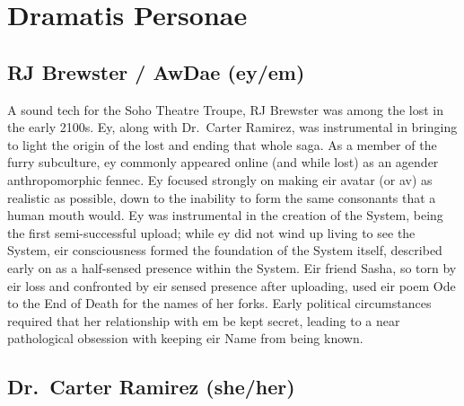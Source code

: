 \section*{Dramatis Personae}

\subsection{RJ Brewster / AwDae (ey/em)}

A sound tech for the Soho Theatre Troupe, RJ Brewster was among the lost in the early 2100s. Ey, along with Dr.~Carter Ramirez, was instrumental in bringing to light the origin of the lost and ending that whole saga. As a member of the furry subculture, ey commonly appeared online (and while lost) as an agender anthropomorphic fennec. Ey focused strongly on making eir avatar (or av) as realistic as possible, down to the inability to form the same consonants that a human mouth would. Ey was instrumental in the creation of the System, {being the first semi-successful upload; while ey did not wind up living to see the System, eir consciousness formed the foundation of the System itself, described early on as a half-sensed presence within the System. Eir friend Sasha, so torn by eir loss and confronted by eir sensed presence after uploading, used eir poem Ode to the End of Death for the names of her forks. Early political circumstances required that her relationship with em be kept secret, leading to a near pathological obsession with keeping eir Name from being known.}


\begin{comment}
\emph{Appears in:}

\begin{itemize}
\tightlist
\item
  \href{https://qoheleth.post-self.ink}{\emph{Qoheleth}}
\item
  \href{https://toledot.post-self.ink}{\emph{Toledot}} (mentioned)
\item
  \href{https://neviim.post-self.ink}{\emph{Nevi'im}}
\item
  \href{https://mitzvot.post-self.ink}{\emph{Mitzvot}} (mentioned)
\item
  ``Selected Letters'' (mentioned)
\end{itemize}
\end{comment}

\subsection{Dr.~Carter Ramirez (she/her)}

